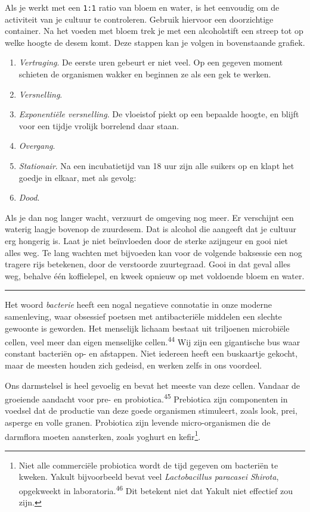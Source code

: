\documentclass[
  11pt,
  dutch,
]{memoir}
\providecommand{\tightlist}{%
  \setlength{\itemsep}{0pt}\setlength{\parskip}{0pt}}
\begin{document}
Als je werkt met een \texttt{1:1} ratio van bloem en water, is het
eenvoudig om de activiteit van je cultuur te controleren. Gebruik
hiervoor een doorzichtige container. Na het voeden met bloem trek je met
een alcoholstift een streep tot op welke hoogte de desem komt. Deze
stappen kan je volgen in bovenstaande grafiek.

\begin{enumerate}
\def\labelenumi{\arabic{enumi}.}
\tightlist
\item
  \emph{Vertraging}. De eerste uren gebeurt er niet veel. Op een gegeven
  moment schieten de organismen wakker en beginnen ze als een gek te
  werken.
\item
  \emph{Versnelling}.
\item
  \emph{Exponentiële versnelling}. De vloeistof piekt op een bepaalde
  hoogte, en blijft voor een tijdje vrolijk borrelend daar staan.
\item
  \emph{Overgang}.
\item
  \emph{Stationair}. Na een incubatietijd van 18 uur zijn alle suikers
  op en klapt het goedje in elkaar, met als gevolg:
\item
  \emph{Dood}.
\end{enumerate}

Als je dan nog langer wacht, verzuurt de omgeving nog meer. Er
verschijnt een waterig laagje bovenop de zuurdesem. Dat is alcohol die
aangeeft dat je cultuur erg hongerig is. Laat je niet beïnvloeden door
de sterke azijngeur en gooi niet alles weg. Te lang wachten met
bijvoeden kan voor de volgende baksessie een nog tragere rijs betekenen,
door de verstoorde zuurtegraad. Gooi in dat geval alles weg, behalve één
koffielepel, en kweek opnieuw op met voldoende bloem en water.

\pfbreak

Het woord \emph{bacterie} heeft een nogal negatieve connotatie in onze
moderne samenleving, waar obsessief poetsen met antibacteriële middelen
een slechte gewoonte is geworden. Het menselijk lichaam bestaat uit
triljoenen microbiële cellen, veel meer dan eigen menselijke
cellen.\textsuperscript{44} Wij zijn een gigantische bus waar constant
bacteriën op- en afstappen. Niet iedereen heeft een buskaartje gekocht,
maar de meesten houden zich gedeisd, en werken zelfs in ons voordeel.

Ons darmstelsel is heel gevoelig en bevat het meeste van deze cellen.
Vandaar de groeiende aandacht voor pre- en
probiotica.\textsuperscript{45} Prebiotica zijn componenten in voedsel
dat de productie van deze goede organismen stimuleert, zoals look, prei,
asperge en volle granen. Probiotica zijn levende micro-organismen die de
darmflora moeten aansterken, zoals yoghurt en kefir\footnote{Niet alle
  commerciële probiotica wordt de tijd gegeven om bacteriën te kweken.
  Yakult bijvoorbeeld bevat veel \emph{Lactobacillus paracasei Shirota},
  opgekweekt in laboratoria.\textsuperscript{46} Dit betekent niet dat
  Yakult niet effectief zou zijn.}.
\end{document}
